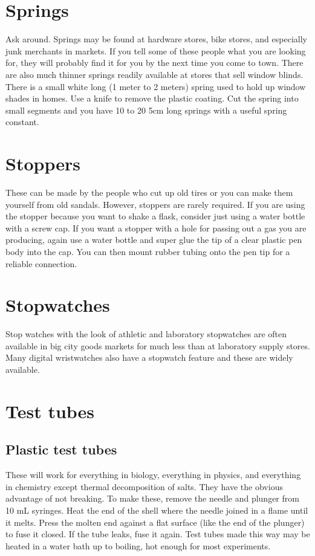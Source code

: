 \section{Springs}
Ask around. 
Springs may be found at hardware stores, 
bike stores, 
and especially junk merchants in markets. 
If you tell some of these people what you are looking for, 
they will probably find it for you by the next time you come to town. 
There are also much thinner springs 
readily available at stores that sell window blinds. 
There is a small white long (1 meter to 2 meters) spring 
used to hold up window shades in homes. 
Use a knife to remove the plastic coating. 
Cut the spring into small segments 
and you have 10 to 20 5cm long springs with a useful spring constant. 

\section{Stoppers}
These can be made by the people who cut up old tires 
or you can make them yourself from old sandals. 
However, 
stoppers are rarely required. 
If you are using the stopper because you want to shake a flask, 
consider just using a water bottle with a screw cap. 
If you want a stopper with a hole for passing out a gas you are producing, 
again use a water bottle 
and super glue the tip of a clear plastic pen body into the cap. 
You can then mount rubber tubing onto the pen tip 
for a reliable connection.

\section{Stopwatches}
Stop watches with the look of athletic and laboratory stopwatches 
are often available in big city goods markets 
for much less than at laboratory supply stores. 
Many digital wristwatches also have a stopwatch feature 
and these are widely available.

\section{Test tubes}

\subsection{Plastic test tubes}
These will work for everything in biology, 
everything in physics, 
and everything in chemistry except thermal decomposition of salts. 
They have the obvious advantage of not breaking. 
To make these, 
remove the needle and plunger from 10 mL syringes. 
Heat the end of the shell where the needle joined in a flame until it melts. 
Press the molten end against a flat surface (like the end of the plunger) 
to fuse it closed. 
If the tube leaks, 
fuse it again. 
Test tubes made this way may be heated in a water bath up to boiling, 
hot enough for most experiments.

